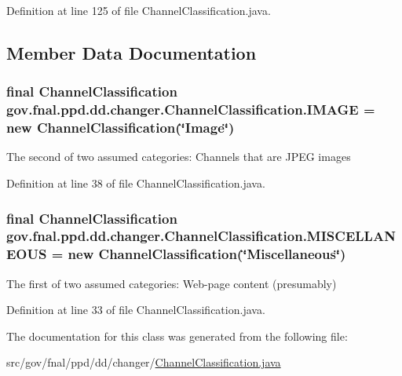 Definition at line 125 of file Channel\-Classification.\-java.



\subsection{Member Data Documentation}
\hypertarget{classgov_1_1fnal_1_1ppd_1_1dd_1_1changer_1_1ChannelClassification_a368a93f6624e94cdd2a80b67e37d6187}{
\subsubsection[{I\-M\-A\-G\-E}]{\setlength{\rightskip}{0pt plus 5cm}final {\bf Channel\-Classification} gov.\-fnal.\-ppd.\-dd.\-changer.\-Channel\-Classification.\-I\-M\-A\-G\-E = new {\bf Channel\-Classification}(\char`\"{}Image\char`\"{})\hspace{0.3cm}{\ttfamily [static]}}}\label{classgov_1_1fnal_1_1ppd_1_1dd_1_1changer_1_1ChannelClassification_a368a93f6624e94cdd2a80b67e37d6187}
The second of two assumed categories\-: Channels that are J\-P\-E\-G images 

Definition at line 38 of file Channel\-Classification.\-java.

\hypertarget{classgov_1_1fnal_1_1ppd_1_1dd_1_1changer_1_1ChannelClassification_aff2ea773d09e0647abdcb5642bbbec0b}{
\subsubsection[{M\-I\-S\-C\-E\-L\-L\-A\-N\-E\-O\-U\-S}]{\setlength{\rightskip}{0pt plus 5cm}final {\bf Channel\-Classification} gov.\-fnal.\-ppd.\-dd.\-changer.\-Channel\-Classification.\-M\-I\-S\-C\-E\-L\-L\-A\-N\-E\-O\-U\-S = new {\bf Channel\-Classification}(\char`\"{}Miscellaneous\char`\"{})\hspace{0.3cm}{\ttfamily [static]}}}\label{classgov_1_1fnal_1_1ppd_1_1dd_1_1changer_1_1ChannelClassification_aff2ea773d09e0647abdcb5642bbbec0b}
The first of two assumed categories\-: Web-\/page content (presumably) 

Definition at line 33 of file Channel\-Classification.\-java.



The documentation for this class was generated from the following file\-:\begin{DoxyCompactItemize}
\item 
src/gov/fnal/ppd/dd/changer/\hyperlink{ChannelClassification_8java}{Channel\-Classification.\-java}\end{DoxyCompactItemize}

